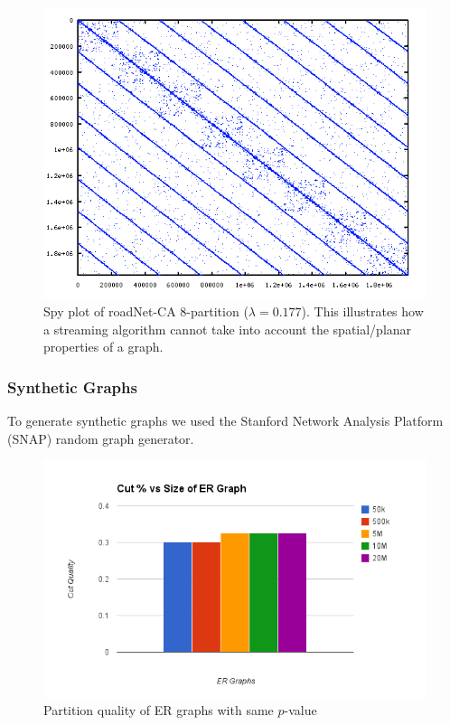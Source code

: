 \documentclass[11pt]{article}
\begin{document}
\begin{figure}[h!]
\centering
\includegraphics[scale=.60] {figures/roadNet-CA8.png}
\caption[Caption for]{Spy plot of roadNet-CA 8-partition ($\lambda=0.177$). This illustrates how a streaming algorithm cannot take into account the spatial/planar properties of a graph.}
\label{fig:4}
\end{figure}

\subsubsection{Synthetic Graphs}
To generate synthetic graphs we used the Stanford Network Analysis Platform (SNAP) random graph generator. 

\begin{figure}[h!]
\centering
  \includegraphics[width=.7\textwidth]{figures/lambda_ER.png}
  \caption{Partition quality of ER graphs with same $p$-value}
  \label{fig:lambdaer}
\end{figure}
\end{document}
